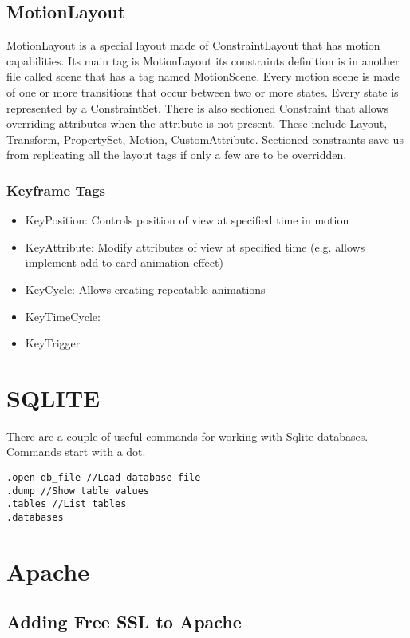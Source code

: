 \documentclass{article}
\begin{document}
\subsection{MotionLayout}
MotionLayout is a special layout made of ConstraintLayout that has motion capabilities. Its main tag is MotionLayout its constraints definition is in another file called scene that has a tag named MotionScene.
Every motion scene is made of one or more transitions that occur between two or more states. Every state is represented by a ConstraintSet.
There is also sectioned Constraint that allows overriding attributes when the attribute is not present. These include Layout, Transform, PropertySet, Motion, CustomAttribute. Sectioned constraints save us from replicating all the layout tags if only a few are to be overridden. 
\subsubsection{Keyframe Tags}
\begin{itemize}
	\item KeyPosition: Controls position of view at specified time in motion
	\item KeyAttribute: Modify attributes of view at specified time (e.g. allows implement add-to-card animation effect)
	\item KeyCycle: Allows creating repeatable animations
	\item KeyTimeCycle: 
	\item KeyTrigger
\end{itemize}


\section{SQLITE}
There are a couple of useful commands for working with Sqlite databases. Commands start with a dot. 

\begin{verbatim}
.open db_file //Load database file
.dump //Show table values 
.tables //List tables
.databases
\end{verbatim}






\section{Apache}
\subsection{Adding Free SSL to Apache}
\end{document}
